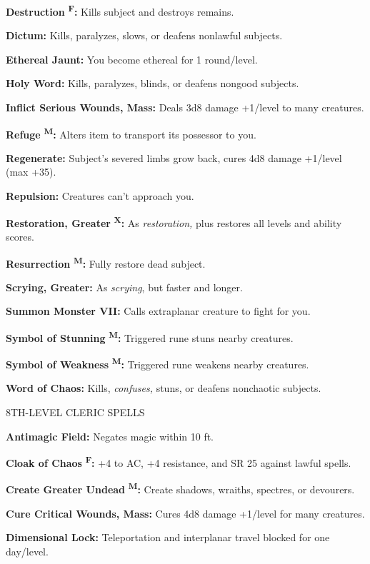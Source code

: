 \documentclass{article}
\begin{document}
\textbf{Destruction }\textsuperscript{\textbf{F}}\textbf{:} Kills subject and destroys 
remains.

\textbf{Dictum:} Kills, paralyzes, slows, or deafens nonlawful subjects.

\textbf{Ethereal Jaunt:} You become ethereal for 1 round/level.

\textbf{Holy Word:} Kills, paralyzes, blinds, or deafens nongood subjects.

\textbf{Inflict Serious Wounds, Mass:} Deals 3d8 damage +1/level to many creatures.

\textbf{Refuge }\textsuperscript{\textbf{M}}\textbf{:} Alters item to transport 
its possessor to you.

\textbf{Regenerate:} Subject's severed limbs grow back, cures 4d8 damage +1/level 
(max +35).

\textbf{Repulsion:} Creatures can't approach you.

\textbf{Restoration, Greater }\textsuperscript{\textbf{X}}\textbf{:} As \textit{restoration, 
}plus restores all levels and ability scores.

\textbf{Resurrection }\textsuperscript{\textbf{M}}\textbf{:} Fully restore dead 
subject.

\textbf{Scrying, Greater:} As \textit{scrying}, but faster and longer.

\textbf{Summon Monster VII:} Calls extraplanar creature to fight for you.

\textbf{Symbol of Stunning }\textsuperscript{\textbf{M}}\textbf{:} Triggered rune 
stuns nearby creatures.

\textbf{Symbol of Weakness }\textsuperscript{\textbf{M}}\textbf{:} Triggered rune 
weakens nearby creatures.

\textbf{Word of Chaos:} Kills, \textit{confuses, }stuns, or deafens nonchaotic 
subjects.

8TH-LEVEL CLERIC SPELLS

\textbf{Antimagic Field:} Negates magic within 10 ft.

\textbf{Cloak of Chaos }\textsuperscript{\textbf{F}}\textbf{:} +4 to AC, +4 resistance, 
and SR 25 against lawful spells.

\textbf{Create Greater Undead }\textsuperscript{\textbf{M}}\textbf{:} Create shadows, 
wraiths, spectres, or devourers.

\textbf{Cure Critical Wounds, Mass:} Cures 4d8 damage +1/level for many creatures.

\textbf{Dimensional Lock:} Teleportation and interplanar travel blocked for one 
day/level.
\end{document}
